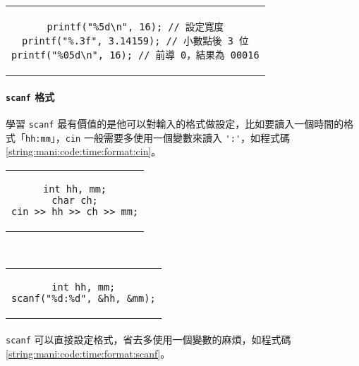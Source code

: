 \documentclass[12pt,a4paper,oneside]{article}
\begin{document}
\begin{CJK}{UTF8}{bkai}
\begin{code}
  \centering
  \begin{tabular}{c}
  \begin{lstlisting}
printf("%5d\n", 16); // 設定寬度
printf("%.3f", 3.14159); // 小數點後 3 位
printf("%05d\n", 16); // 前導 0，結果為 00016
  \end{lstlisting}
  \end{tabular}
  \caption{\lstinline!printf! 格式範例}
  \label{string:mani:code:printf:format}
\end{code}

\paragraph{\lstinline!scanf! 格式}學習 \lstinline!scanf! 最有價值的是他可以對輸入的格式做設定，比如要讀入一個時間的格式「\lstinline!hh:mm!」，\lstinline!cin! 一般需要多使用一個變數來讀入 \lstinline!':'!，如程式碼 \ref{string:mani:code:time:format:cin}。

\begin{code}[h!]
  \centering
  \begin{subcode}{.43\textwidth}
    \centering
    \begin{tabular}{c}
    \begin{lstlisting}
int hh, mm;
char ch;
cin >> hh >> ch >> mm;
    \end{lstlisting}
    \end{tabular}
    \caption{用 \lstinline!cin! 輸入}
    \label{string:mani:code:time:format:cin}
  \end{subcode}
  ~
  \begin{subcode}{.33\textwidth}
    \centering
    \begin{tabular}{c}
    \begin{lstlisting}
int hh, mm;
scanf("%d:%d", &hh, &mm);
    \end{lstlisting}
    \end{tabular}
    \caption{用 \lstinline!scanf! 輸入}
    \label{string:mani:code:time:format:scanf}
  \end{subcode}
  \caption{比較 \lstinline!cin! 與 \lstinline!scanf! 差異}
  \label{string:mani:code:time:format}
\end{code}

\paragraph{}\lstinline!scanf! 可以直接設定格式，省去多使用一個變數的麻煩，如程式碼 \ref{string:mani:code:time:format:scanf}。


\end{CJK}
\end{document}
